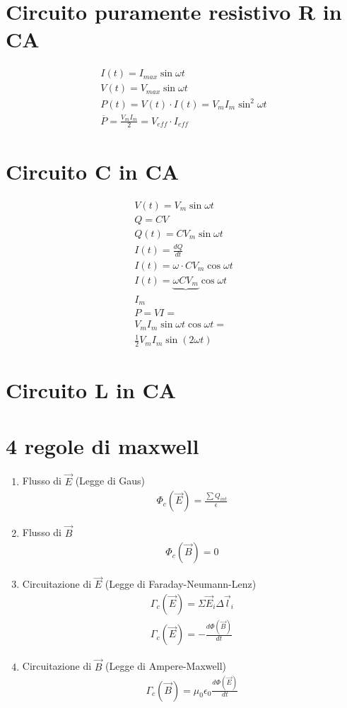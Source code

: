 \documentclass{article}
\begin{document}
\section{Circuito puramente resistivo R in CA}
\begin{gather*}
    I(t) = I_{max}\sin \omega t\\
    V(t) = V_{max}\sin \omega t\\
    P(t)=V(t)\cdot I(t)=V_{m}I_m\sin^2 \omega t\\
    \overline{P}=\frac{V_mI_m}{2}=V_{eff}\cdot I_{eff}
\end{gather*}
\section{Circuito C in CA}
\begin{gather*}
    V(t)=V_m\sin \omega t\\
    Q=CV\\
    Q(t)=CV_m\sin \omega t\\
    I(t)=\frac{dQ}{dt}\\
    I(t)=\omega \cdot CV_m\cos \omega t\\
    I(t)=\underbrace{\omega CV_m}\cos \omega t\\
    I_m\\
    P=VI=\\
    V_mI_m\sin \omega t \cos \omega t=\\
    \frac{1}{2}V_mI_m\sin (2\omega t)
\end{gather*}
\section{Circuito L in CA}
\section{4 regole di maxwell}
\begin{enumerate}
    \item Flusso di $\vec{E}$
    (Legge di Gaus)
    \begin{gather*}
        \Phi_c(\vec{E})=\frac{\sum Q_{int}}{\epsilon}
    \end{gather*}
    \item Flusso di $\vec{B}$
    \begin{gather*}
    \Phi_c(\vec{B})=0
    \end{gather*}
    \item Circuitazione di $\vec{E}$
    (Legge di Faraday-Neumann-Lenz)
    \begin{gather*}
        \Gamma_c(\vec{E})=\Sigma\vec{E}_i\Delta\vec{l}_i\\
        \Gamma_c(\vec{E})=-\frac{d\Phi(\vec{B})}{dt}
    \end{gather*}
    \item Circuitazione di $\vec{B}$
    (Legge di Ampere-Maxwell)
    \begin{gather*}
        \Gamma_c(\vec{B})=\mu_0\epsilon_0\frac{d\Phi(\vec{E})}{dt}
    \end{gather*}
\end{enumerate}
\end{document}

